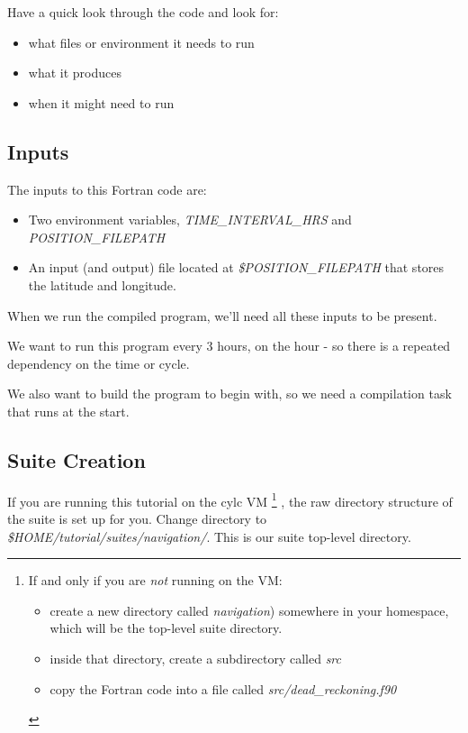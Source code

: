 Have a quick look through the code and look for:
\begin{itemize}
    \item what files or environment it needs to run
    \item what it produces
    \item when it might need to run
\end{itemize}

\subsection{Inputs}

The inputs to this Fortran code are:
\begin{itemize}
    \item Two environment variables, {\em TIME\_INTERVAL\_HRS} and {\em POSITION\_FILEPATH}
    \item An input (and output) file located at {\em \$POSITION\_FILEPATH} that stores the latitude and longitude.
\end{itemize}

When we run the compiled program, we'll need all these inputs to be present.

We want to run this program every 3 hours, on the hour - so there is a repeated dependency on the time or cycle.

We also want to build the program to begin with, so we need a compilation task that runs at the start.

\subsection{Suite Creation}

If you are running this tutorial on the cylc VM \footnote{
    If and only if you are {\em not} running on the VM:
\begin{itemize}
    \item create a new directory called {\em navigation}) somewhere in your homespace, which will be the top-level suite directory.
    \item inside that directory, create a subdirectory called {\em src}
    \item copy the Fortran code into a file called {\em src/dead\_reckoning.f90}
\end{itemize}
} , the raw directory structure of the suite is set up for you. Change directory to {\em \$HOME/tutorial/suites/navigation/}. This is our suite top-level directory.

